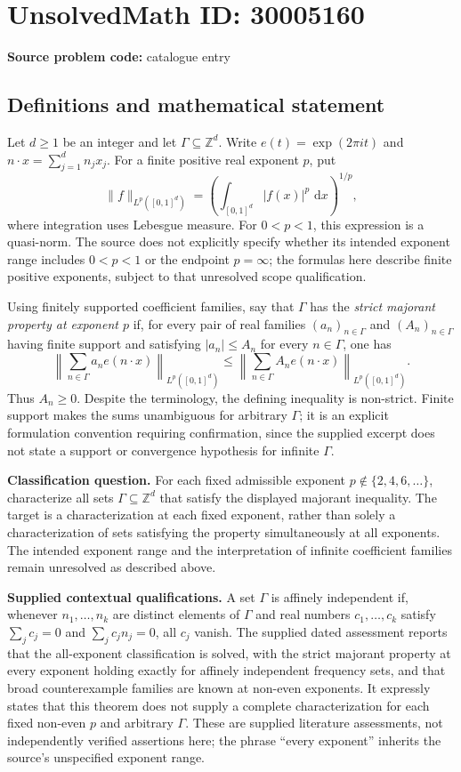 \documentclass[11pt]{article}
\newcommand{\Z}{\mathbb{Z}}
\newcommand{\dd}{\,\mathrm{d}}
\begin{document}
\section*{UnsolvedMath ID: 30005160}
\textbf{Source problem code:} catalogue entry
\subsection{Definitions and mathematical statement}
Let \(d\geq 1\) be an integer and let \(\Gamma\subseteq\Z^d\). Write \(e(t)=\exp(2\pi i t)\) and \(n\cdot x=\sum_{j=1}^d n_jx_j\). For a finite positive real exponent \(p\), put
\[
\|f\|_{L^p([0,1]^d)}=\left(\int_{[0,1]^d}|f(x)|^p\,\dd x\right)^{1/p},
\]
where integration uses Lebesgue measure. For \(0<p<1\), this expression is a quasi-norm. The source does not explicitly specify whether its intended exponent range includes \(0<p<1\) or the endpoint \(p=\infty\); the formulas here describe finite positive exponents, subject to that unresolved scope qualification.

Using finitely supported coefficient families, say that \(\Gamma\) has the \emph{strict majorant property at exponent \(p\)} if, for every pair of real families \((a_n)_{n\in\Gamma}\) and \((A_n)_{n\in\Gamma}\) having finite support and satisfying \(|a_n|\leq A_n\) for every \(n\in\Gamma\), one has
\[
\left\|\sum_{n\in\Gamma}a_ne(n\cdot x)\right\|_{L^p([0,1]^d)}
\leq
\left\|\sum_{n\in\Gamma}A_ne(n\cdot x)\right\|_{L^p([0,1]^d)}.
\]
Thus \(A_n\geq0\). Despite the terminology, the defining inequality is non-strict. Finite support makes the sums unambiguous for arbitrary \(\Gamma\); it is an explicit formulation convention requiring confirmation, since the supplied excerpt does not state a support or convergence hypothesis for infinite \(\Gamma\).

\textbf{Classification question.} For each fixed admissible exponent \(p\notin\{2,4,6,\ldots\}\), characterize all sets \(\Gamma\subseteq\Z^d\) that satisfy the displayed majorant inequality. The target is a characterization at each fixed exponent, rather than solely a characterization of sets satisfying the property simultaneously at all exponents. The intended exponent range and the interpretation of infinite coefficient families remain unresolved as described above.

\textbf{Supplied contextual qualifications.} A set \(\Gamma\) is affinely independent if, whenever \(n_1,\ldots,n_k\) are distinct elements of \(\Gamma\) and real numbers \(c_1,\ldots,c_k\) satisfy \(\sum_jc_j=0\) and \(\sum_jc_jn_j=0\), all \(c_j\) vanish. The supplied dated assessment reports that the all-exponent classification is solved, with the strict majorant property at every exponent holding exactly for affinely independent frequency sets, and that broad counterexample families are known at non-even exponents. It expressly states that this theorem does not supply a complete characterization for each fixed non-even \(p\) and arbitrary \(\Gamma\). These are supplied literature assessments, not independently verified assertions here; the phrase ``every exponent'' inherits the source's unspecified exponent range.
\end{document}
